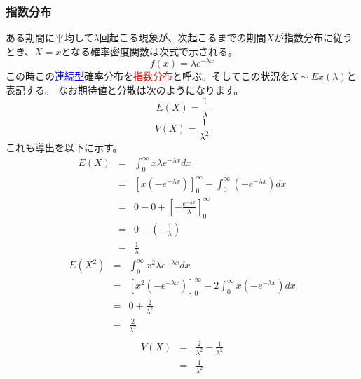 \documentclass[a4paper,10pt]{jarticle}
\begin{document}
\subsubsection{指数分布}
ある期間に平均して$\lambda$回起こる現象が、次起こるまでの期間$X$が指数分布に従うとき、$X=x$となる確率密度関数は次式で示される。
\begin{equation}
    f(x) = \lambda e^{-\lambda x}\tag{3,17}
\end{equation}
この時この\textcolor{blue}{連続型}確率分布を\textcolor{red}{指数分布}と呼ぶ。そしてこの状況を$X\sim Ex(\lambda)$と表記する。
なお期待値と分散は次のようになります。
\begin{equation}
    E(X)=\frac{1}{\lambda}\tag{3,18}
\end{equation}
\begin{equation}
    V(X)=\frac{1}{\lambda^2}\tag{3,19}
\end{equation}
これも導出を以下に示す。
\begin{eqnarray*}
    E(X) &=& \int_0^\infty x\lambda e^{-\lambda x}dx \\
    &=& \left[x(-e^{-\lambda x})\right]_0^\infty -\int_0^\infty(-e^{-\lambda x})dx\\
    &=& 0-0+\left[-\frac{e^{-\lambda x}}{\lambda}\right]_0^\infty\\
    &=& 0-(-\frac{1}{\lambda})\\
    &=& \frac{1}{\lambda}
\end{eqnarray*}
\begin{eqnarray*}
    E(X^2)&=& \int_0^\infty x^2\lambda e^{-\lambda x}dx \\
    &=& \left[x^2(-e^{-\lambda x})\right]_0^\infty -2\int_0^\infty x(-e^{-\lambda x})dx\\
    &=& 0+\frac{2}{\lambda^2}\\
    &=& \frac{2}{\lambda^2}\\
\end{eqnarray*}
\begin{eqnarray*}
    V(X) &=& \frac{2}{\lambda^2} - \frac{1}{\lambda^2}\\
    &=& \frac{1}{\lambda^2}
\end{eqnarray*}
\end{document}
